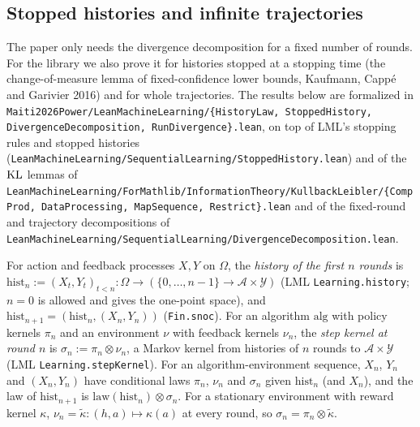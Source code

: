 \subsection{Stopped histories and infinite trajectories}
\label{sec:pre_info_stopping}

The paper only needs the divergence decomposition for a fixed number of rounds. For the library
we also prove it for histories stopped at a stopping time (the change-of-measure lemma of
fixed-confidence lower bounds, Kaufmann, Capp\'e and Garivier 2016) and for whole trajectories.
The results below are formalized in \texttt{Maiti2026Power/LeanMachineLearning/\{HistoryLaw,
StoppedHistory, DivergenceDecomposition, RunDivergence\}.lean}, on top of LML's stopping rules
and stopped histories (\texttt{LeanMachineLearning/SequentialLearning/StoppedHistory.lean}) and
of the $\mathrm{KL}$ lemmas of
\texttt{LeanMachineLearning/ForMathlib/InformationTheory/KullbackLeibler/\{CompProd,
DataProcessing, MapSequence, Restrict\}.lean} and of the fixed-round and trajectory
decompositions of \texttt{LeanMachineLearning/SequentialLearning/DivergenceDecomposition.lean}.

\begin{definition}\label{def:fin_history}
\leanok
{}
For action and feedback processes $X, Y$ on $\Omega$, the \emph{history of the first $n$ rounds}
is $\mathrm{hist}_n := (X_t, Y_t)_{t < n} : \Omega \to (\{0,\dots,n-1\}\to\mathcal{A}\times\mathcal{Y})$
(LML \texttt{Learning.history}; $n = 0$ is allowed and gives the one-point space), and
$\mathrm{hist}_{n+1} = (\mathrm{hist}_n, (X_n, Y_n))$ (\texttt{Fin.snoc}). For an algorithm
$\mathrm{alg}$ with policy kernels $\pi_n$ and an environment $\nu$ with feedback kernels
$\nu_n$, the \emph{step kernel at round $n$} is $\sigma_n := \pi_n\otimes\nu_n$, a Markov kernel
from histories of $n$ rounds to $\mathcal{A}\times\mathcal{Y}$ (LML \texttt{Learning.stepKernel}).
For an algorithm-environment sequence, $X_n$, $Y_n$ and $(X_n, Y_n)$ have conditional laws
$\pi_n$, $\nu_n$ and $\sigma_n$ given $\mathrm{hist}_n$ (and $X_n$), and the law of
$\mathrm{hist}_{n+1}$ is $\mathrm{law}(\mathrm{hist}_n)\otimes\sigma_n$. For a stationary
environment with reward kernel $\kappa$, $\nu_n = \tilde\kappa : (h, a)\mapsto\kappa(a)$ at
every round, so $\sigma_n = \pi_n\otimes\tilde\kappa$.
\end{definition}

